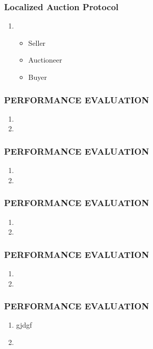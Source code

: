 \documentclass[11pt]{class}
\begin{document}
										\begin{frame}
											\frametitle{Localized Auction Protocol}
											\begin{enumerate}
												\item 
												\begin{itemize}
													\item Seller
													\item Auctioneer
													\item Buyer
												\end{itemize}
												
											\end{enumerate}
										\end{frame}
										\begin{frame}
											\frametitle{PERFORMANCE EVALUATION}
											\begin{enumerate}
												\item 
												\item 
											\end{enumerate}
										\end{frame}
										\begin{frame}
											\frametitle{PERFORMANCE EVALUATION}
											\begin{enumerate}
												\item 
												\item 
											\end{enumerate}
										\end{frame}
										\begin{frame}
											\frametitle{PERFORMANCE EVALUATION}
											\begin{enumerate}
												\item 
												\item 
											\end{enumerate}
										\end{frame}
										\begin{frame}
											\frametitle{PERFORMANCE EVALUATION}
											\begin{enumerate}
												\item 
												\item 
											\end{enumerate}
										\end{frame}
										\begin{frame}
											\frametitle{PERFORMANCE EVALUATION}
											\begin{enumerate}
												\item gjdgf
												\item 
											\end{enumerate}
										\end{frame}
										
\end{document}
